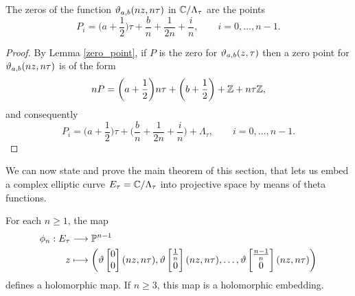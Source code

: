 \begin{cor}
	\label{cor_zeros}
	The zeros of the function $\vartheta_{a,b}(nz,n\tau)$ in $\mathbb{C}/\Lambda_{\tau}$ are the points
	\begin{equation}
		\label{zeros}
		P_{i} = \bigg(a + \frac{1}{2}\bigg)\tau + \frac{b}{n} + \frac{1}{2n} + \frac{i}{n},\qquad i= 0, \ldots, n-1.
	\end{equation}
\end{cor}

\begin{proof}
	By Lemma \ref{zero_point}, if $P$ is the zero for $\vartheta_{a,b}(z,\tau)$ then a zero point for $\vartheta_{a,b}(nz,n\tau)$ is of the form
	\begin{equation*}
		nP = \bigg(a + \frac{1}{2}\bigg)n\tau + \bigg(b + \frac{1}{2}\bigg) + \mathbb{Z} + n\tau\mathbb{Z},
	\end{equation*}
	and consequently
	\begin{equation}
		P_{i} = \bigg(a+\frac{1}{2}\bigg)\tau + \bigg(\frac{b}{n} + \frac{1}{2n} + \frac{i}{n}\bigg) + \Lambda_{\tau},\qquad i = 0,\ldots,n-1.
	\end{equation}
\end{proof}

We can now state and prove the main theorem of this section, that lets us embed a complex elliptic curve $E_{\tau} = \mathbb{C}/\Lambda_{\tau}$ into projective space by means of theta functions.\\

\begin{theorem}
	For each $n\geq 1$, the map
	\begin{equation*}
		\begin{split}
		\phi_{n}:E_{\tau}&\longrightarrow \mathbb{P}^{n-1}\\
		z &\longmapsto \bigg(\vartheta\begin{bmatrix} 0\\ 0 \end{bmatrix}(nz,n\tau),\vartheta\begin{bmatrix} \frac{1}{n}\\ 0 \end{bmatrix}(nz,n\tau),\ldots, \vartheta\begin{bmatrix} \frac{n-1}{n}\\ 0 \end{bmatrix}(nz,n\tau)\bigg)
		\end{split}
	\end{equation*}
	defines a holomorphic map. If $n\geq 3$, this map is a holomorphic embedding.
\end{theorem}


